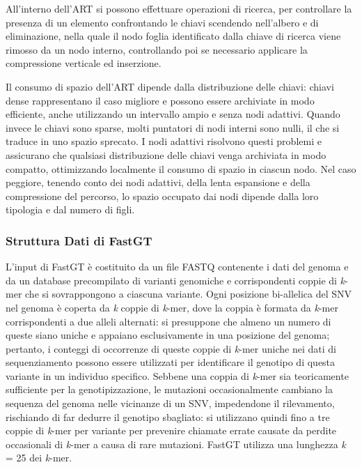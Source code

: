 \documentclass[../main.tex]{subfiles}
\begin{document}
All'interno dell'ART si possono effettuare operazioni di ricerca, per controllare la presenza di un elemento confrontando le chiavi scendendo nell'albero e di eliminazione, nella quale il nodo foglia identificato dalla chiave di ricerca viene rimosso da un nodo interno, controllando poi se necessario applicare la compressione verticale ed inserzione.

Il consumo di spazio dell'ART dipende dalla distribuzione delle chiavi: chiavi dense rappresentano il caso migliore e possono essere archiviate in modo efficiente, anche utilizzando un intervallo ampio e senza nodi adattivi. Quando invece le chiavi sono sparse, molti puntatori di nodi interni sono nulli, il che si traduce in uno spazio sprecato. I nodi adattivi risolvono questi problemi e assicurano che qualsiasi distribuzione delle chiavi venga archiviata in modo compatto, ottimizzando localmente il consumo di spazio in ciascun nodo. Nel caso peggiore, tenendo conto dei nodi adattivi, della lenta espansione e della compressione del percorso, lo spazio occupato dai nodi dipende dalla loro tipologia e dal numero di figli.

\subsubsection{Struttura Dati di FastGT}
\label{strutturaDatiFastGT}

L'input di FastGT è costituito da un file FASTQ contenente i dati del genoma e da un database precompilato di varianti genomiche e corrispondenti coppie di \textit{k}-mer che si sovrappongono a ciascuna variante. Ogni posizione bi-allelica del SNV nel genoma è coperta da \textit{k} coppie di \textit{k}-mer, dove la coppia è formata da \textit{k}-mer corrispondenti a due alleli alternati: si presuppone che almeno un numero di queste siano uniche e appaiano esclusivamente in una posizione del genoma; pertanto, i conteggi di occorrenze di queste coppie di \textit{k}-mer uniche nei dati di sequenziamento possono essere utilizzati per identificare il genotipo di questa variante in un individuo specifico. Sebbene una coppia di \textit{k}-mer sia teoricamente sufficiente per la genotipizzazione, le mutazioni occasionalmente cambiano la sequenza del genoma nelle vicinanze di un SNV, impedendone il rilevamento, rischiando di far dedurre il genotipo sbagliato: si utilizzano quindi fino a tre coppie di \textit{k}-mer per variante per prevenire chiamate errate causate da perdite occasionali di \textit{k}-mer a causa di rare mutazioni. FastGT utilizza una lunghezza \textit{k }= 25 dei \textit{k}-mer. \\
\end{document}
